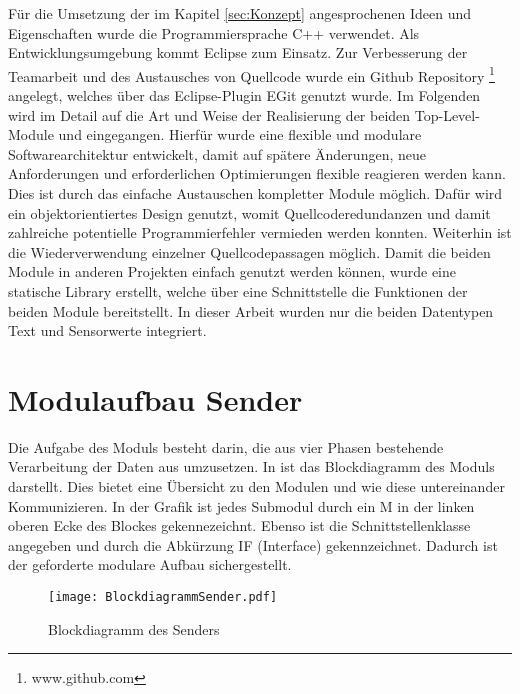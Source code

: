 
F{\"u}r die Umsetzung der im Kapitel \ref{sec:Konzept} angesprochenen Ideen und
Eigenschaften wurde die Programmiersprache C++ verwendet. Als Entwicklungsumgebung kommt
Eclipse zum Einsatz. Zur Verbesserung der Teamarbeit und des Austausches
von Quellcode wurde ein Github Repository \footnote{www.github.com} angelegt,
welches {\"u}ber das Eclipse-Plugin EGit genutzt wurde. \newline Im Folgenden wird
im Detail auf die Art und Weise der Realisierung der beiden Top-Level-Module
 und  eingegangen. Hierf{\"u}r wurde eine flexible und
modulare Softwarearchitektur entwickelt, damit auf sp{\"a}tere {\"A}nderungen, neue Anforderungen
und erforderlichen Optimierungen flexible reagieren werden kann. Dies ist durch
das einfache Austauschen kompletter Module m{\"o}glich.
Daf{\"u}r wird ein objektorientiertes Design genutzt, womit Quellcoderedundanzen und damit
zahlreiche potentielle Programmierfehler vermieden werden konnten.
Weiterhin ist die Wiederverwendung einzelner Quellcodepassagen m{\"o}glich.\newline
Damit die beiden Module in anderen Projekten einfach genutzt werden k{\"o}nnen,
wurde eine statische Library erstellt, welche {\"u}ber eine Schnittstelle die Funktionen
der beiden Module bereitstellt. In dieser Arbeit wurden nur die beiden
Datentypen Text und Sensorwerte integriert.

\section{Modulaufbau Sender}

Die Aufgabe des Moduls  besteht darin, die aus vier Phasen
bestehende Verarbeitung der Daten aus  umzusetzen. In
 ist das Blockdiagramm des Moduls 
darstellt.
Dies bietet eine {\"U}bersicht zu den Modulen und wie diese untereinander 
Kommunizieren. In der Grafik ist jedes Submodul durch ein M in der linken
oberen Ecke des Blockes gekennezeichnt. Ebenso ist die Schnittstellenklasse angegeben
und durch die Abk{\"u}rzung IF (Interface) gekennzeichnet. Dadurch ist der geforderte modulare
Aufbau sichergestellt.

\begin{figure}[H]
\centering
\texttt{[image: BlockdiagrammSender.pdf]} %
\caption{Blockdiagramm des Senders}
\label{fig:BlockdiagrammSender}
\end{figure}

